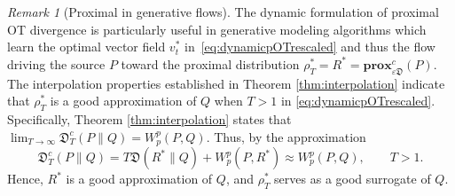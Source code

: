 \documentclass{amsart}
\newcommand{\rb}[1]{#1} %
\theoremstyle{definition}
\theoremstyle{remark}
\newtheorem{remark}[theorem]{Remark}
\numberwithin{equation}{section}
\begin{document}
\begin{remark}[Proximal in generative flows]
 The dynamic formulation of proximal OT divergence is particularly useful in generative modeling algorithms which learn the optimal vector field $v_t^*$ in~\eqref{eq:dynamicpOTrescaled} and thus the flow driving the source $P$ toward the proximal \rb{distribution} $\rho_T^*=R^*=\textbf{prox}^c_{\varepsilon \mathfrak{D}}(P)$. The interpolation properties established in Theorem \ref{thm:interpolation} indicate that $\rho_T^*$ is a good approximation of $Q$ 
when $T>1$ in \eqref{eq:dynamicpOTrescaled}. Specifically, Theorem \ref{thm:interpolation} states that $\lim_{T \to \infty}\mathfrak{D}^{c}_{T}(P\|Q) = W_p^p(P,Q)$. Thus, by the approximation  
\begin{equation}
\mathfrak{D}^{c}_{T}(P\|Q)= T\mathfrak{D}(R^*\|Q) +  W_p^p(P,R^*)\approx W_p^p(P,Q),\qquad T>1.
\end{equation}
Hence, $R^*$ is a good approximation of $Q$, and $\rho^*_T$ serves as a good surrogate of $Q$. 
\end{remark}
\end{document}
